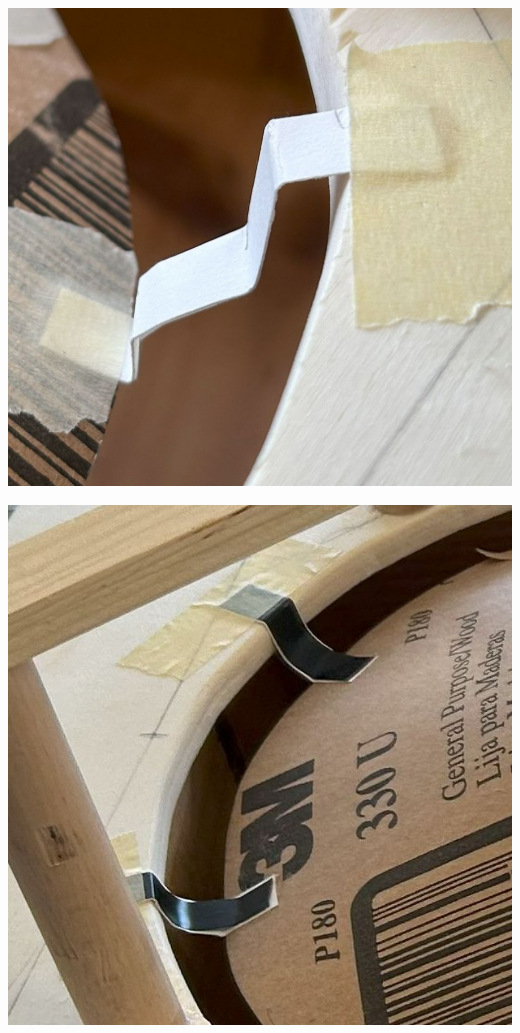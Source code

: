 \documentclass[a4paper,11pt]{report}
\begin{document}
\begin{minipage}{0.3\textwidth}
    \centering
    \includegraphics[width=.8\linewidth]{resources/images/Fotos/Physik-77.jpg}
    \label{fig:w_sicke}
\end{minipage}
\begin{minipage}{0.3\textwidth}
    \centering
    \includegraphics[width=.8\linewidth]{resources/images/Fotos/Physik-96.jpg}
    \label{fig:c_sicke}
\end{minipage}
\end{document}
